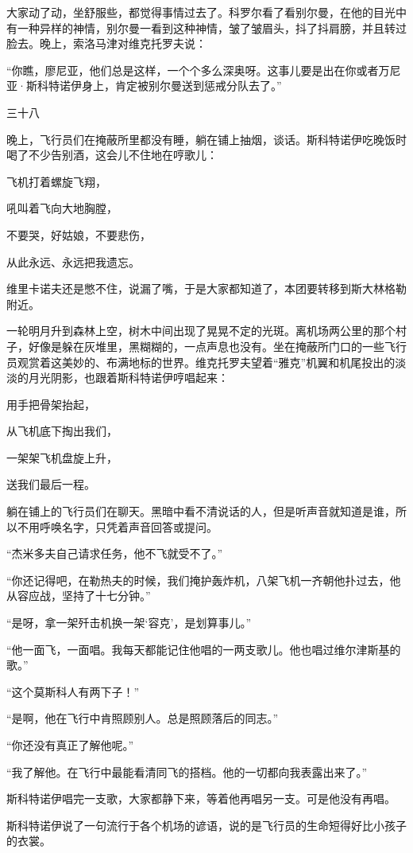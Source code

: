 大家动了动，坐舒服些，都觉得事情过去了。科罗尔看了看别尔曼，在他的目光中有一种异样的神情，别尔曼一看到这种神情，皱了皱眉头，抖了抖肩膀，并且转过脸去。晚上，索洛马津对维克托罗夫说：

“你瞧，廖尼亚，他们总是这样，一个个多么深奥呀。这事儿要是出在你或者万尼亚·斯科特诺伊身上，肯定被别尔曼送到惩戒分队去了。”

三十八

晚上，飞行员们在掩蔽所里都没有睡，躺在铺上抽烟，谈话。斯科特诺伊吃晚饭时喝了不少告别酒，这会儿不住地在哼歌儿：

飞机打着螺旋飞翔，

吼叫着飞向大地胸膛，

不要哭，好姑娘，不要悲伤，

从此永远、永远把我遗忘。

维里卡诺夫还是憋不住，说漏了嘴，于是大家都知道了，本团要转移到斯大林格勒附近。

一轮明月升到森林上空，树木中间出现了晃晃不定的光斑。离机场两公里的那个村子，好像是躲在灰堆里，黑糊糊的，一点声息也没有。坐在掩蔽所门口的一些飞行员观赏着这美妙的、布满地标的世界。维克托罗夫望着“雅克”机翼和机尾投出的淡淡的月光阴影，也跟着斯科特诺伊哼唱起来：

用手把骨架抬起，

从飞机底下掏出我们，

一架架飞机盘旋上升，

送我们最后一程。

躺在铺上的飞行员们在聊天。黑暗中看不清说话的人，但是听声音就知道是谁，所以不用呼唤名字，只凭着声音回答或提问。

“杰米多夫自己请求任务，他不飞就受不了。”

“你还记得吧，在勒热夫的时候，我们掩护轰炸机，八架飞机一齐朝他扑过去，他从容应战，坚持了十七分钟。”

“是呀，拿一架歼击机换一架‘容克’，是划算事儿。”

“他一面飞，一面唱。我每天都能记住他唱的一两支歌儿。他也唱过维尔津斯基的歌。”

“这个莫斯科人有两下子！”

“是啊，他在飞行中肯照顾别人。总是照顾落后的同志。”

“你还没有真正了解他呢。”

“我了解他。在飞行中最能看清同飞的搭档。他的一切都向我表露出来了。”

斯科特诺伊唱完一支歌，大家都静下来，等着他再唱另一支。可是他没有再唱。

斯科特诺伊说了一句流行于各个机场的谚语，说的是飞行员的生命短得好比小孩子的衣裳。

